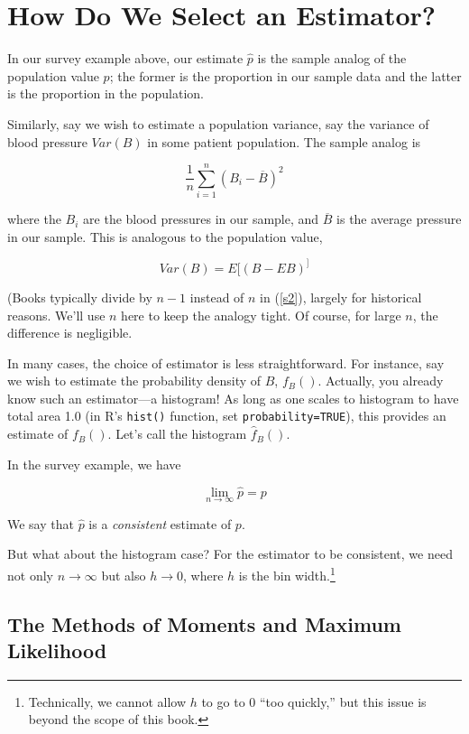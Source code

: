 \section{How Do We Select an Estimator?}

In our survey example above, our estimate $\widehat{p}$ is the sample
analog of the population value $p$; the former is the proportion in our
sample data and the latter is the proportion in the population.

Similarly, say we wish to estimate a population variance, say the
variance of blood pressure $Var(B)$ in some patient population.  The
sample analog is

\begin{equation}
\label{s2}
\frac{1}{n} \sum_{i=1}^n (B_i - \overline{B})^2
\end{equation}

where the $B_i$ are the blood pressures in our sample, and $\overline{B}$
is the average pressure in our sample.  This is analogous to the
population value,

\begin{equation}
Var(B) = E[(B - EB)^]
\end{equation}

(Books typically divide by $n-1$ instead of $n$ in (\ref{s2}), largely
for historical reasons.  We'll use $n$ here to keep the analogy tight.
Of course, for large $n$, the difference is negligible.

In many cases, the choice of estimator is less straightforward.  For
instance, say we wish to estimate the probability density of $B$, 
$f_B()$.  Actually, you already know such an estimator---a histogram!
As long as one scales to histogram to have total area 1.0 (in R's
\lstinline{hist()} function, set \lstinline{probability=TRUE}), this
provides an estimate of $f_B()$.  Let's call the histogram
$\widehat{f}_B()$.

In the survey example, we have 

\begin{equation}
\lim_{n \rightarrow \infty} \widehat{p} = p
\end{equation}

We say that $\widehat{p}$ is a \textit{consistent} estimate of $p$.

But what about the histogram case?  For the estimator to be consistent,
we need not only $n \rightarrow \infty$ but also $h \rightarrow 0$,
where $h$ is the bin width.\footnote{Technically, we cannot allow $h$
to go to 0 ``too quickly,'' but this issue is beyond the scope of this
book.}

\subsection{The Methods of Moments and Maximum Likelihood}
